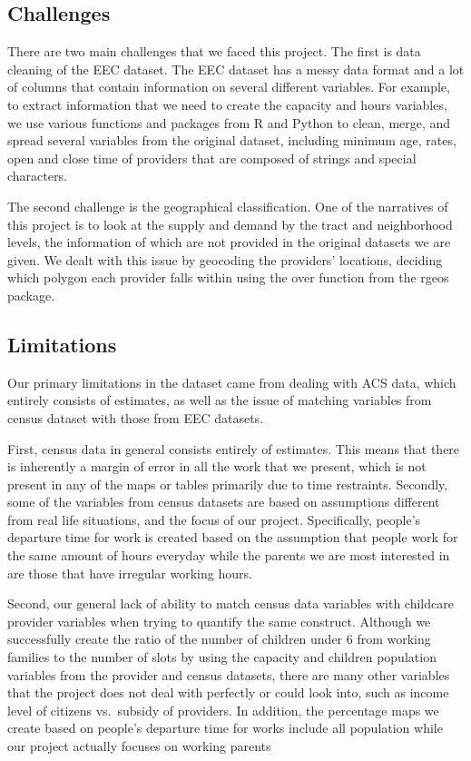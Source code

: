 \documentclass[10pt,letterpaper]{article}
\begin{document}
\subsection{Challenges}\label{challenges}

There are two main challenges that we faced this project. The first is
data cleaning of the EEC dataset. The EEC dataset has a messy data
format and a lot of columns that contain information on several
different variables. For example, to extract information that we need to
create the capacity and hours variables, we use various functions and
packages from R and Python to clean, merge, and spread several variables
from the original dataset, including minimum age, rates, open and close
time of providers that are composed of strings and special characters.

The second challenge is the geographical classification. One of the
narratives of this project is to look at the supply and demand by the
tract and neighborhood levels, the information of which are not provided
in the original datasets we are given. We dealt with this issue by
geocoding the providers' locations, deciding which polygon each provider
falls within using the over function from the rgeos package.

\subsection{Limitations}\label{limitations}

Our primary limitations in the dataset came from dealing with ACS data,
which entirely consists of estimates, as well as the issue of matching
variables from census dataset with those from EEC datasets.

First, census data in general consists entirely of estimates. This means
that there is inherently a margin of error in all the work that we
present, which is not present in any of the maps or tables primarily due
to time restraints. Secondly, some of the variables from census datasets
are based on assumptions different from real life situations, and the
focus of our project. Specifically, people's departure time for work is
created based on the assumption that people work for the same amount of
hours everyday while the parents we are most interested in are those
that have irregular working hours.

Second, our general lack of ability to match census data variables with
childcare provider variables when trying to quantify the same construct.
Although we successfully create the ratio of the number of children
under 6 from working families to the number of slots by using the
capacity and children population variables from the provider and census
datasets, there are many other variables that the project does not deal
with perfectly or could look into, such as income level of citizens
vs.~subsidy of providers. In addition, the percentage maps we create
based on people's departure time for works include all population while
our project actually focuses on working parents
\end{document}
